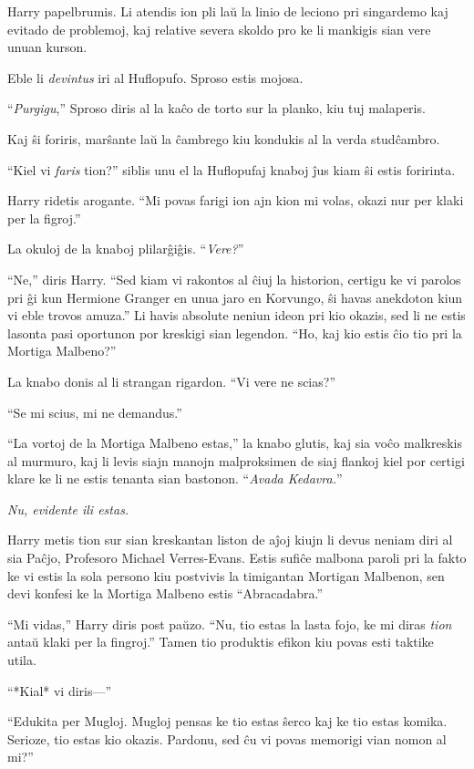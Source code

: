Harry papelbrumis. Li atendis ion pli laŭ la linio de leciono pri singardemo kaj
evitado de problemoj, kaj relative severa skoldo pro ke li mankigis sian vere
unuan kurson.

Eble li \emph{devintus} iri al Huflopufo. Sproso estis mojosa.

``\emph{Purgigu},'' Sproso diris al la kaĉo de torto sur la planko, kiu tuj
malaperis.

Kaj ŝi foriris, marŝante laŭ la ĉambrego kiu kondukis al la verda studĉambro.


``Kiel vi \emph{faris} tion?'' siblis unu el la Huflopufaj knaboj ĵus
kiam ŝi estis foririnta.

Harry ridetis arogante. ``Mi povas farigi ion ajn kion mi volas, okazi nur per
klaki per la figroj.''

La okuloj de la knaboj plilarĝiĝis. ``\emph{Vere?}''

``Ne,'' diris Harry. ``Sed kiam vi rakontos al ĉiuj la historion, certigu ke vi
parolos pri ĝi kun Hermione Granger en unua jaro en Korvungo, ŝi havas anekdoton
kiun vi eble trovos amuza.'' Li havis absolute neniun ideon pri kio okazis, sed
li ne estis lasonta pasi oportunon por kreskigi sian legendon. ``Ho, kaj kio
estis ĉio tio pri la Mortiga Malbeno?''

La knabo donis al li strangan rigardon. ``Vi vere ne scias?''

``Se mi scius, mi ne demandus.''

``La vortoj de la Mortiga Malbeno estas,'' la knabo glutis, kaj sia voĉo
malkreskis al murmuro, kaj li levis siajn manojn malproksimen de siaj flankoj
kiel por certigi klare ke li ne estis tenanta sian bastonon. ``\emph{Avada
Kedavra.}''

\emph{Nu, evidente ili estas.}

Harry metis tion sur sian kreskantan liston de aĵoj kiujn li devus neniam diri al
sia Paĉjo, Profesoro Michael Verres-Evans. Estis sufiĉe malbona paroli pri la
fakto ke vi estis la sola persono kiu postvivis la timigantan Mortigan Malbenon,
sen devi konfesi ke la Mortiga Malbeno estis ``Abracadabra.''

``Mi vidas,'' Harry diris post paŭzo. ``Nu, tio estas la lasta fojo,
ke mi diras \emph{tion} antaŭ klaki per la fingroj.'' Tamen tio
produktis efikon kiu povas esti taktike utila.

``*Kial* vi diris—''

``Edukita per Mugloj. Mugloj pensas ke tio estas ŝerco kaj ke tio
estas komika. Serioze, tio estas kio okazis. Pardonu, sed ĉu vi povas
memorigi vian nomon al mi?''

